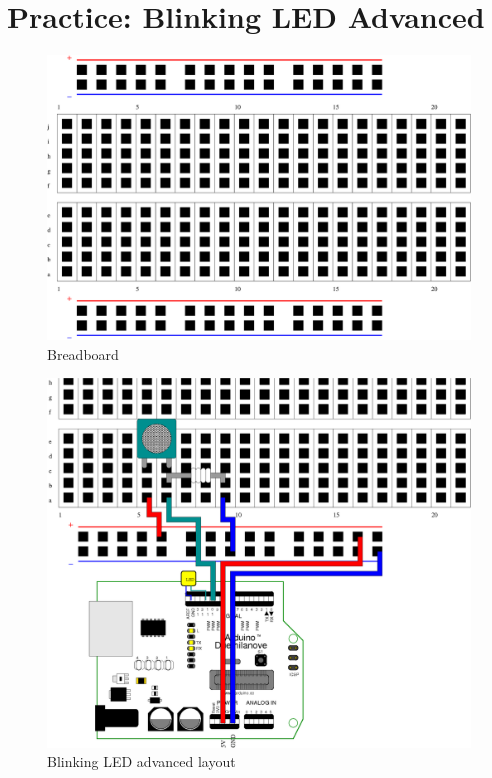 \section{Practice: Blinking LED Advanced}\label{pract:blinkingLEDAdvanced}

\begin{figure}[htbp]
  \centering
  \includegraphics[width=0.7\linewidth]{figures/breadboard.eps}
  \caption{Breadboard
  \label{fig:breadboard}}
\end{figure}

\begin{figure}[htbp]
  \centering
  \includegraphics[width=0.7\linewidth]{figures/blinkingLEDAdvanced-scaled.eps}
  \caption{Blinking LED advanced layout
  \label{fig:blinkingLEDLayout}}
\end{figure}
